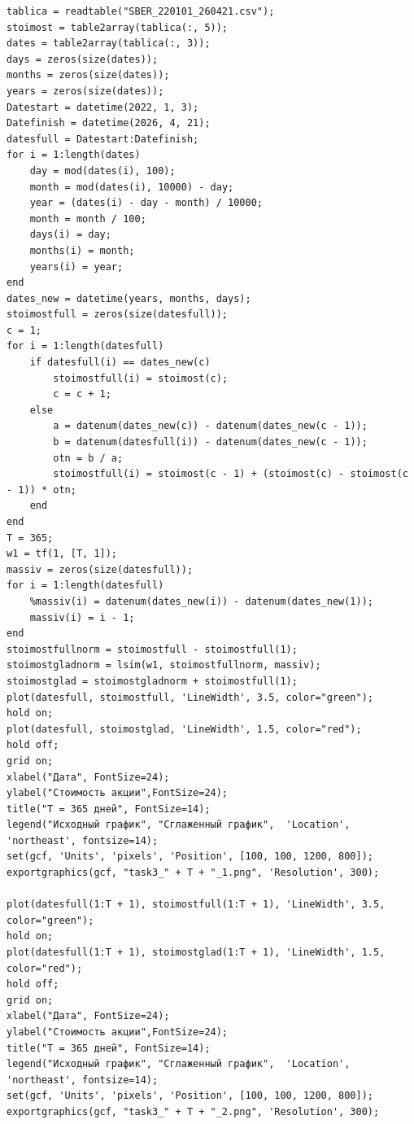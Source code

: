 \documentclass[a4paper, 12pt]{article}
\begin{document}
\begin{lstlisting}[caption={Код для фильтрации функции в третьем пункте}]
tablica = readtable("SBER_220101_260421.csv");
stoimost = table2array(tablica(:, 5));
dates = table2array(tablica(:, 3));
days = zeros(size(dates));
months = zeros(size(dates));
years = zeros(size(dates));
Datestart = datetime(2022, 1, 3);
Datefinish = datetime(2026, 4, 21);
datesfull = Datestart:Datefinish;
for i = 1:length(dates)
    day = mod(dates(i), 100);
    month = mod(dates(i), 10000) - day;
    year = (dates(i) - day - month) / 10000;
    month = month / 100;
    days(i) = day;
    months(i) = month;
    years(i) = year;
end
dates_new = datetime(years, months, days);
stoimostfull = zeros(size(datesfull));
c = 1;
for i = 1:length(datesfull)
    if datesfull(i) == dates_new(c)
        stoimostfull(i) = stoimost(c);
        c = c + 1;
    else
        a = datenum(dates_new(c)) - datenum(dates_new(c - 1));
        b = datenum(datesfull(i)) - datenum(dates_new(c - 1));
        otn = b / a;
        stoimostfull(i) = stoimost(c - 1) + (stoimost(c) - stoimost(c - 1)) * otn;
    end
end
T = 365;
w1 = tf(1, [T, 1]);
massiv = zeros(size(datesfull));
for i = 1:length(datesfull)
    %massiv(i) = datenum(dates_new(i)) - datenum(dates_new(1));
    massiv(i) = i - 1;
end
stoimostfullnorm = stoimostfull - stoimostfull(1);
stoimostgladnorm = lsim(w1, stoimostfullnorm, massiv);
stoimostglad = stoimostgladnorm + stoimostfull(1);
plot(datesfull, stoimostfull, 'LineWidth', 3.5, color="green");
hold on;
plot(datesfull, stoimostglad, 'LineWidth', 1.5, color="red");
hold off;
grid on;
xlabel("Дата", FontSize=24);
ylabel("Стоимость акции",FontSize=24);
title("T = 365 дней", FontSize=14);
legend("Исходный график", "Сглаженный график",  'Location', 'northeast', fontsize=14);
set(gcf, 'Units', 'pixels', 'Position', [100, 100, 1200, 800]);
exportgraphics(gcf, "task3_" + T + "_1.png", 'Resolution', 300);

plot(datesfull(1:T + 1), stoimostfull(1:T + 1), 'LineWidth', 3.5, color="green");
hold on;
plot(datesfull(1:T + 1), stoimostglad(1:T + 1), 'LineWidth', 1.5, color="red");
hold off;
grid on;
xlabel("Дата", FontSize=24);
ylabel("Стоимость акции",FontSize=24);
title("T = 365 дней", FontSize=14);
legend("Исходный график", "Сглаженный график",  'Location', 'northeast', fontsize=14);
set(gcf, 'Units', 'pixels', 'Position', [100, 100, 1200, 800]);
exportgraphics(gcf, "task3_" + T + "_2.png", 'Resolution', 300);
\end{lstlisting}
\end{document}
